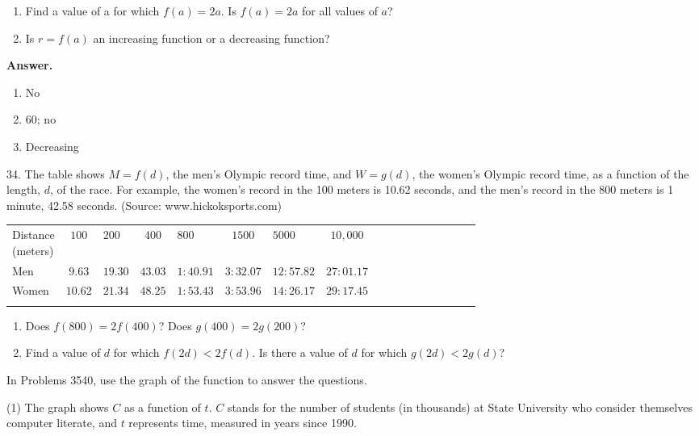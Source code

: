 \documentclass[10pt,]{book}
\makeatletter
\theoremstyle{plain}
\theoremstyle{definition}
\theoremstyle{definition}
\theoremstyle{definition}
\theoremstyle{definition}
\numberwithin{equation}{part}
\newcommand{\hrulethin}  {\noalign{\hrule height 0.04em}}
\newcommand{\hrulethick} {\noalign{\hrule height 0.11em}}
\newcommand{\tablecelllines}[3]%
{\begin{tabular}[#2]{@{}#1@{}}#3\end{tabular}}
\newcommand{\lt}{<}
\makeatother
\begin{document}
\begin{exerciselist}
\begin{enumerate}[label=\alph*]
\item\hypertarget{li-368}{}Find a value of a for which \(f (a) = 2a\). Is \(f (a) = 2a\) for all values of \(a\)?%
\item\hypertarget{li-369}{}Is \(r = f (a)\) an increasing function or a decreasing function?%
\end{enumerate}
%
\par\smallskip
\par\smallskip
\noindent\textbf{Answer.}\hypertarget{answer-60}{}\quad
\leavevmode%
\begin{enumerate}[label=\alph*]
\item\hypertarget{li-370}{}No%
\item\hypertarget{li-371}{}60; no%
\item\hypertarget{li-372}{}Decreasing%
\end{enumerate}
%
\item[34.]\hypertarget{exercise-103}{}The table shows \(M = f (d)\), the men's Olympic record time, and \(W = g(d)\), the women's Olympic record time, as a function of the length, \(d\), of the race. For example, the women’s record in the 100 meters is 10.62 seconds, and the men’s record in the 800 meters is 1 minute, 42.58 seconds. (Source: www.hickoksports.com) \begin{tabular}{AcAcAcAcAcAcAcAcA}\hrulethick
\tablecelllines{c}{m}
{Distance\\
(meters)}
&\(100\)&\(200\)&\(400\)&\(800\)&\(1500\)&\(5000\)&\(10,000\)\tabularnewline\hrulethin
Men&\(9.63\)&\(19.30\)&\(43.03\)&\(1:40.91\)&\(3:32.07\)&\(12:57.82\)&\(27:01.17\)\tabularnewline\hrulethin
Women&\(10.62\)&\(21.34\)&\(48.25\)&\(1:53.43\)&\(3:53.96\)&\(14:26.17\)&\(29:17.45\)\tabularnewline\hrulethin
\end{tabular}
 \leavevmode%
\begin{enumerate}[label=\alph*]
\item\hypertarget{li-373}{}Does \(f (800) = 2 f (400)\)? Does \(g(400) = 2g(200)\)?%
\item\hypertarget{li-374}{}Find a value of \(d\) for which \(f (2d)\lt 2f (d)\). Is there a value of \(d\) for which \(g(2d)\lt 2g(d)\)?%
\end{enumerate}
%
\par\smallskip
\hypertarget{exercisegroup-11}{}\par\noindent In Problems 35\textemdash{}40, use the graph of the function to answer the questions.%
\begin{exercisegroup}(1)
\exercise[35.]\hypertarget{exercise-104}{}The graph shows \(C\) as a function of \(t\). \(C\) stands for the number of students (in thousands) at State University who consider themselves computer literate, and \(t\) represents time, measured in years since 1990.%

\end{exercisegroup}
\end{exerciselist}
\end{document}
